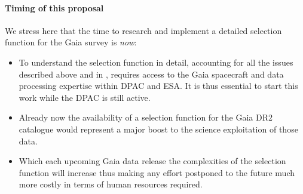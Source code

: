 \paragraph{Timing of this proposal} We stress here that the time to research and implement a detailed selection function for the Gaia survey is \emph{now}:
\begin{itemize}
    \item To understand the selection function in detail, accounting for all the issues described above and in , requires access to the Gaia spacecraft and data processing expertise within DPAC and ESA. It is thus essential to start this work while the DPAC is still active.
    \item Already now the availability of a selection function for the Gaia DR2 catalogue would represent a major boost to the science exploitation of those data.
    \item Which each upcoming Gaia data release the complexities of the selection function will increase thus making any effort postponed to the future much more costly in terms of human resources required.
\end{itemize}

